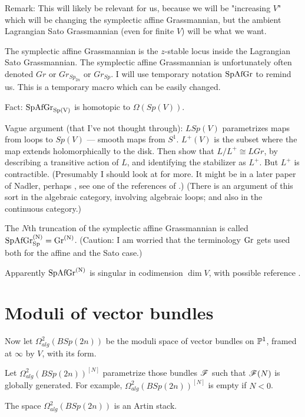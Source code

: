 {Remark:
This will likely be relevant for us, because we will be "increasing $V$" which will be changing the symplectic affine Grassmannian, but the ambient Lagrangian Sato Grassmannian (even for finite $V$) will be what we want.  


The symplectic affine Grassmannian is the $z$-stable locus inside the Lagrangian Sato Grassmannian.
The symplectic affine Grassmannian is  unfortunately 
often denoted  $Gr$ or $Gr_{Sp_{2n}}$ or $Gr_{Sp}$. I will use temporary notation $\rm{SpAfGr}$ to remind us.  This is a temporary macro which can be easily changed.

Fact:  $\rm{SpAfGr}_{Sp(V)}$ is homotopic to $\Omega(Sp(V))$.

Vague argument (that I've not thought through):    $L Sp(V)$ parametrizes maps from loops to $Sp(V)$ --- smooth maps from $S^1$.  $L^+(V)$ is the subset where the map extends holomorphically to the disk.  Then show that $L/L^+ \cong LGr$, by describing a transitive action of $L$, and identifying the stabilizer as $L^+$.  But $L^+$ is contractible.  (Presumably I should look at \cite{ps} for more. It might be in a later paper of  Nadler, perhaps \cite{nadler}, see one of the references of \cite{zhu}.)   (There is an argument of this sort in the algebraic category, involving algebraic loops; and also in the continuous category.)

The $N$th truncation of the symplectic affine Grassmannian is 
called $\rm{SpAfGr}_{Sp}^{(N)} = \rm{Gr}^{(N)}$.  (Caution:  I am worried that the terminology  $\rm{Gr}$  gets used both for the affine and the Sato case.)

Apparently $\rm{SpAfGr}^{(N)}$  is singular in codimension $\dim V$, with possible reference  \cite{mov}. 


\section{Moduli of vector bundles}

Now let $\Omega^2_{alg}(BSp(2n))$  be the moduli space of vector bundles on $\mathbb P^1$, framed at $\infty$ by $V$, with its form.

Let $\Omega^2_{alg}(BSp(2n))^{[N]}$ parametrize those bundles ${\mathscr{F}}$ such that ${\mathscr{F}}(N)$ is globally generated. For example, 
$\Omega^2_{alg}(BSp(2n))^{[N]}$ is empty if $N<0$.

The space 
$\Omega^2_{alg}(BSp(2n))$ 
is an Artin stack.  

}

